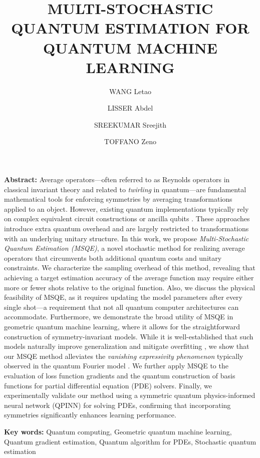 \documentclass[12pt]{article}
\title{\fontsize{14pt}{16pt}\selectfont
\MakeUppercase{Multi-Stochastic Quantum Estimation for Quantum Machine Learning}}
\author[]{WANG Letao}
\author[]{LISSER Abdel}
\author[]{SREEKUMAR Sreejith}
\author[]{TOFFANO Zeno}
\affil[1]{\small Laboratory of Signals and Systems, CentraleSupélec, CNRS, Université Paris-Saclay, France}
\affil[]{\small
Emails:
\href{mailto:letao.wang@centralesupelec.fr}{letao.wang@centralesupelec.fr};
\href{mailto:abdel.lisser@centralesupelec.fr}{abdel.lisser@centralesupelec.fr};
    \href{mailto:sreejith.sreekumar@centralesupelec.fr}{sreejith.sreekumar@centralesupelec.fr};
\href{mailto:zeno.toffano@centralesupelec.fr}{zeno.toffano@centralesupelec.fr}
}
\date{}
\theoremstyle{plain}
\theoremstyle{definition}
\begin{document}
\maketitle

\vspace{-0.7cm}

\textbf{Abstract:} Average operators—often referred to as Reynolds operators in classical invariant theory and related to \textit{twirling} in quantum—are fundamental mathematical tools for enforcing symmetries by averaging transformations applied to an object. However, existing quantum implementations typically rely on complex equivalent circuit constructions \cite{simple_Meyer2023} or ancilla qubits \cite{simple_Nguyen2024}. These approaches introduce extra quantum overhead and are largely restricted to transformations with an underlying unitary structure. In this work, we propose \textit{Multi-Stochastic Quantum Estimation (MSQE)}, a novel stochastic method for realizing average operators that circumvents both additional quantum costs and unitary constraints. We characterize the sampling overhead of this method, revealing that achieving a target estimation accuracy of the average function may require either more or fewer shots relative to the original function. Also, we discuss the physical feasibility of MSQE, as it requires updating the model parameters after every single shot—a requirement that not all quantum computer architectures can accommodate. Furthermore, we demonstrate the broad utility of MSQE in geometric quantum machine learning, where it allows for the straightforward construction of symmetry-invariant models. While it is well-established that such models naturally improve generalization and mitigate overfitting \cite{simple_Meyer2023}, we show that our MSQE method alleviates the \textit{vanishing expressivity phenomenon} typically observed in the quantum Fourier model \cite{simple_Mhiri2025constrained}. We further apply MSQE to the evaluation of loss function gradients and the quantum construction of basis functions for partial differential equation (PDE) solvers. Finally, we experimentally validate our method using a symmetric quantum physics-informed neural network (QPINN) for solving PDEs, confirming that incorporating symmetries significantly enhances learning performance.

\textbf{Key words:} Quantum computing, Geometric quantum machine learning, Quantum gradient estimation, Quantum algorithm for PDEs, Stochastic quantum estimation

\vspace{-0.5cm}



\end{document}
